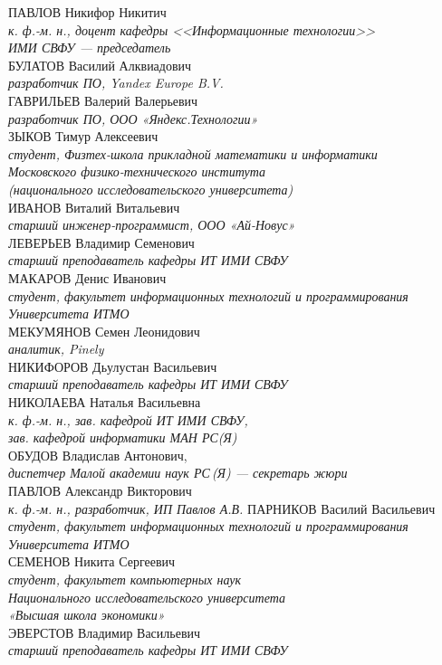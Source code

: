 ПАВЛОВ Никифор Никитич \\
\textit{к. ф.-м. н., доцент кафедры <<Информационные технологии>>\\ ИМИ СВФУ --- председатель}
\\[2mm]
БУЛАТОВ Василий Алквиадович\\
\textit{разработчик ПО, Yandex Europe B.V.}
\\[2mm]
ГАВРИЛЬЕВ Валерий Валерьевич\\
\textit{разработчик ПО, ООО «Яндекс.Технологии»}
\\[2mm]
ЗЫКОВ Тимур Алексеевич\\ 
\textit{студент, Физтех-школа прикладной математики и информатики \\
Московского физико-технического института \\
(национального исследовательского университета)}
\\[2mm]
ИВАНОВ Виталий Витальевич\\
\textit{старший инженер-программист, ООО «Ай-Новус»}
\\[2mm]
ЛЕВЕРЬЕВ Владимир Семенович \\
\textit{старший преподаватель кафедры ИТ ИМИ СВФУ}
\\[2mm]
МАКАРОВ Денис Иванович\\
\textit{студент, факультет информационных технологий и программирования Университета ИТМО}
\\[2mm]
МЕКУМЯНОВ Семен Леонидович\\
\textit{аналитик, Pinely}
\\[2mm]
НИКИФОРОВ Дьулустан Васильевич \\
\textit{старший преподаватель кафедры ИТ ИМИ СВФУ}
\\[2mm]
НИКОЛАЕВА Наталья Васильевна \\
\textit{к. ф.-м. н., зав. кафедрой ИТ ИМИ СВФУ,\\
зав. кафедрой информатики МАН РС(Я)}
\\[2mm]
ОБУДОВ Владислав Антонович, \\
\textit{диспетчер  Малой академии наук РС\,(Я) --- секретарь жюри}
\\[2mm]
ПАВЛОВ Александр Викторович \\
\textit{к. ф.-м. н., разработчик, ИП Павлов А.В.}
\newpage\noindent
ПАРНИКОВ Василий Васильевич\\
\textit{студент, факультет информационных технологий и программирования Университета ИТМО}
\\[2mm]
СЕМЕНОВ Никита Сергеевич\\
\textit{студент, факультет компьютерных наук \\
Национального исследовательского университета \\
«Высшая школа экономики»}
\\[2mm]
ЭВЕРСТОВ Владимир Васильевич \\
\textit{старший преподаватель кафедры ИТ ИМИ СВФУ}

